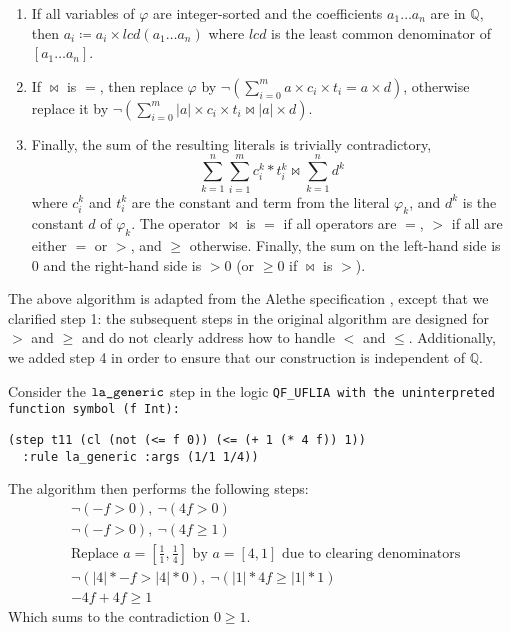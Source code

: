 \begin{enumerate}
    \item If all variables of $\varphi$ are integer-sorted and the coefficients $a_1 \dots a_n$ are in $\mathbb{Q}$,
    then $a_i \coloneq a_i \times \mathit{lcd}(a_1 \dots a_n)$ where $\mathit{lcd}$ is the least common denominator of $[a_1 \dots a_n]$.
    
    \item If $\bowtie$ is $=$, then replace $\varphi$ by
    $\neg (\sum_{i=0}^{m}a\times{}c_i\times{}t_i = a\times{}d)$, otherwise replace it by
    $\neg (\sum_{i=0}^{m}|a|\times{}c_i\times{}t_i \bowtie |a|\times{}d)$.

    \item Finally, the sum of the resulting literals is trivially contradictory,
    \[
        \sum_{k=1}^{n}\sum_{i=1}^{m}c_i^k*t_i^k \bowtie \sum_{k=1}^{n}d^k
    \]
  where $c_i^k$ and $t_i^k$ are the constant and term from the literal $\varphi_k$, and $d^k$ is the constant $d$ of $\varphi_k$.
  The operator $\bowtie$ is $=$ if all operators are $=$, $>$ if all are either $=$ or $>$, and $\geq$ otherwise. Finally, the sum on the left-hand side is $0$ and the right-hand side is $>0$ (or $\geq 0$ if $\bowtie$ is $>$).

\end{enumerate}

The above algorithm is adapted from the Alethe specification \cite{alethespec}, except that we clarified step 1: the subsequent steps in the original algorithm are designed for $>$ and $\geq$ and do not clearly address how to handle $<$ and $\leq$.
Additionally, we added step 4 in order to ensure that our construction is independent of $\mathbb{Q}$.

\begin{example}
Consider the $\tt{la\_generic}$ step in the logic \tt{QF\_UFLIA} with the uninterpreted function symbol \lstinline[language=SMT,basicstyle=\ttfamily\upshape]|(f Int)|:
\begin{lstlisting}[language=SMT,label={lst:lageneric-example}]
(step t11 (cl (not (<= f 0)) (<= (+ 1 (* 4 f)) 1))
  :rule la_generic :args (1/1 1/4))
\end{lstlisting} 
%
The algorithm then performs the following steps:
\begin{align}
&\neg (- f > 0),~ \neg(4f > 0) \label{eq:step2}\tag{Step 2}\\
&\neg (- f > 0),~ \neg(4f \geq 1) \label{eq:step3}\tag{Step 3}\\
&\text{Replace } a = [\frac{1}{1}, \frac{1}{4}] \text{ by } a = [4, 1] \text{ due to clearing denominators} \label{eq:step4}\tag{Step 4}\\
&\neg (|4| * - f > |4| * 0 ), ~ \neg(|1| * 4f \geq |1| * 1) \label{eq:step5}\tag{Step 5} \\
&-4f + 4f \geq 1 \label{eq:step6}\tag{Step 6}
\end{align}
Which sums to the contradiction  $0 \geq 1$.
\label{ex:la_generic_example_red}
\end{example}
